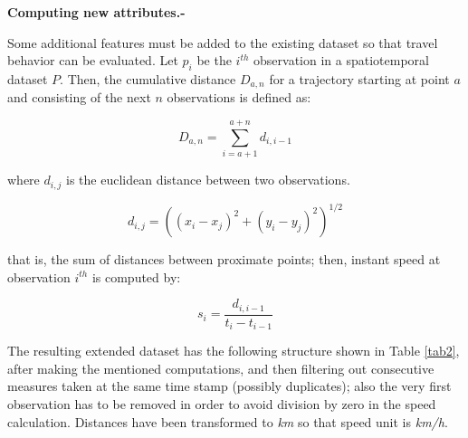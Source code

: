 \documentclass[runningheads]{llncs}
\begin{document}
\textbf{Computing new attributes.-}

Some additional features must be added to the existing dataset so that travel behavior can be evaluated. Let \(p_i\) be the \(i^{th}\) observation in a spatiotemporal dataset \(P\). Then, the cumulative distance \(D_{a,n}\) for a trajectory starting at point \(a\) and consisting of the next \(n\) observations is defined as:

\begin{equation}
  D_{a,n}=\sum_{i=a+1}^{a+n}d_{i, i-1}
\end{equation}

where \(d_{i,j}\) is the euclidean distance between two observations.

\begin{equation}
  d_{i,j}=((x_i-x_{j})^2+(y_i-y_{j})^2)^{1/2}
\end{equation}

that is, the sum of distances between proximate points; then, instant speed at observation \(i^{th}\) is computed by:

\begin{equation}
  s_{i} = \frac{d_{i,i-1}}{t_{i}-t_{i-1}}
\end{equation}

The resulting extended dataset has the following structure shown in Table \ref{tab2}, after making the mentioned computations, and then filtering out consecutive measures taken at the same time stamp (possibly duplicates); also the very first observation has to be removed in order to avoid division by zero in the speed calculation. Distances have been transformed to \emph{km} so that speed unit is \emph{km/h}.
\end{document}
